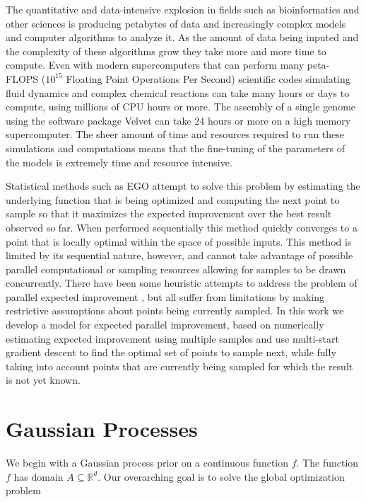 \documentclass[phd,tocprelim]{cornell}
\begin{document}
The quantitative and data-intensive explosion in fields such as bioinformatics and other sciences is producing petabytes of data and increasingly complex models and computer algorithms to analyze it. As the amount of data being inputed and the complexity of these algorithms grow they take more and more time to compute. Even with modern supercomputers that can perform many peta-FLOPS ($10^{15}$ Floating Point Operations Per Second) \cite{Hopper} scientific codes simulating fluid dynamics \cite{Compo2011} and complex chemical reactions \cite{Valiev2010} can take many hours or days to compute, using millions of CPU hours or more. The assembly of a single genome using the software package Velvet \cite{Zerbino2008} can take 24 hours or more on a high memory supercomputer. The sheer amount of time and resources required to run these simulations and computations means that the fine-tuning of the parameters of the models is extremely time and resource intensive.

Statistical methods such as EGO \cite{Jones1998} attempt to solve this problem by estimating the underlying function that is being optimized and computing the next point to sample so that it maximizes the expected improvement over the best result observed so far. When performed sequentially this method quickly converges to a point that is locally optimal within the space of possible inputs. This method is limited by its sequential nature, however, and cannot take advantage of possible parallel computational or sampling resources allowing for samples to be drawn concurrently. There have been some heuristic attempts to address the problem of parallel expected improvement \cite{Ginsbourger2008}, but all suffer from limitations by making restrictive assumptions about points being currently sampled. In this work we develop a model for expected parallel improvement, based on numerically estimating expected improvement using multiple samples and use multi-start gradient descent to find the optimal set of points to sample next, while fully taking into account points that are currently being sampled for which the result is not yet known.

\section{Gaussian Processes}

We begin with a Gaussian process prior on a continuous function $f$. The function $f$ has domain $A \subseteq \mathbb{R}^{d}$. Our overarching goal is to solve the global optimization problem
\end{document}
